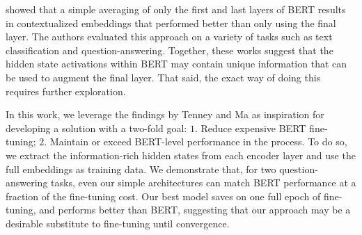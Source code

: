 \cite{ma2019universal} showed that a simple averaging of only the first and last layers of BERT results in contextualized embeddings that performed better than only using the final layer. The authors evaluated this approach on a variety of tasks such as text classification and question-answering. Together, these works suggest that the hidden state activations within BERT may contain unique information that can be used to augment the final layer. That said, the exact way of doing this requires further exploration.

In this work, we leverage the findings by Tenney and Ma as inspiration for developing a solution with a two-fold goal: $1.$ Reduce expensive BERT fine-tuning; $2.$ Maintain or exceed BERT-level performance in the process. To do so, we extract the information-rich hidden states from each encoder layer and use the full embeddings as training data. We demonstrate that, for two question-answering tasks, even our simple architectures can match BERT performance at a fraction of the fine-tuning cost. Our best model saves on one full epoch of fine-tuning, and performs better than BERT, suggesting that our approach may be a desirable substitute to fine-tuning until convergence.
